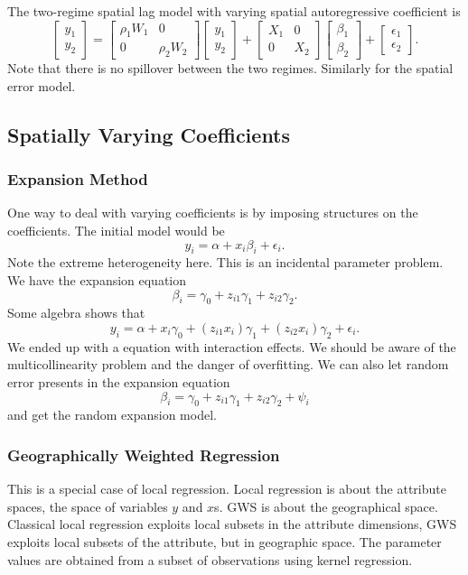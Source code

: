 \documentclass[11pt,a4paper]{amsart}
\theoremstyle{plain}
\theoremstyle{definition}
\begin{document}
The two-regime spatial lag model with varying spatial autoregressive coefficient is 
\[	\begin{bmatrix}
	y_{1}\\
	y_{2}
\end{bmatrix} = 
\begin{bmatrix}
	\rho_{1}W_{1} & 0 \\
	0 & \rho_{2}W_{2}
\end{bmatrix}
\begin{bmatrix}
	y_{1}\\
	y_{2}
\end{bmatrix} + 
\begin{bmatrix}
	X_{1} & 0 \\
	0 & X_{2}
\end{bmatrix} 
\begin{bmatrix}
	\beta_{1}\\
	\beta_{2}
\end{bmatrix} + 
\begin{bmatrix}
	\epsilon_{1}\\
	\epsilon_{2}
\end{bmatrix}.	\]
Note that there is no spillover between the two regimes. Similarly for the spatial error model.

\subsection{Spatially Varying Coefficients}\hfill\par 
\subsubsection{Expansion Method}
One way to deal with varying coefficients is by imposing structures on the coefficients. The initial model would be 
\[	y_{i} = \alpha + x_{i}\beta_{i} + \epsilon_{i}.	\]
Note the extreme heterogeneity here. This is an incidental parameter problem. We have the expansion equation
\[	\beta_{i} = \gamma_{0} + z_{i1}\gamma_{1} + z_{i2}\gamma_{2}.	\]
Some algebra shows that 
\[	y_{i} = \alpha + x_{i}\gamma_{0} + (z_{i1}x_{i})\gamma_{1} + (z_{i2}x_{i})\gamma_{2} + \epsilon_{i}.	\]
We ended up with a equation with interaction effects. We should be aware of the multicollinearity problem and the danger of overfitting. We can also let random error presents in the expansion equation
\[\beta_{i} = \gamma_{0} + z_{i1}\gamma_{1} + z_{i2}\gamma_{2} + \psi_{i}\]
and get the random expansion model.

\subsubsection{Geographically Weighted Regression}\hfill\par 
This is a special case of local regression. Local regression is about the attribute spaces, the space of variables $y$ and $x$s.  GWS is about the geographical space. Classical local regression exploits local subsets in the attribute dimensions, GWS exploits local subsets of the attribute, but in geographic space. The parameter values are obtained from a subset of observations using kernel regression. 
\end{document}
